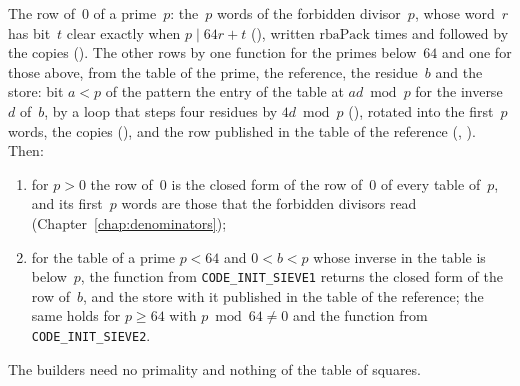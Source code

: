 \begin{lemma}\label{lem:primeRows}
  \leanok
  The row of~$0$ of a prime~$p$: the~$p$ words of the forbidden divisor~$p$, whose word~$r$ has
  bit~$t$ clear exactly when $p \mid 64 r + t$ (), written
  $\mathrm{rbaPack}$ times and followed by the copies ().
  The other rows by one function for the primes below~$64$ and one for those above, from the table
  of the prime, the reference, the residue~$b$ and the store: bit $a < p$ of the pattern the entry
  of the table at $a d \bmod p$ for the inverse~$d$ of~$b$, by a loop that steps four residues by
  $4 d \bmod p$ (), rotated into the first~$p$ words, the copies
  (), and the row published in the table of the reference
  (, ). Then:
  \begin{enumerate}
    \item for $p > 0$ the row of~$0$ is the closed form of the row of~$0$ of every table of~$p$,
      and its first~$p$ words are those that the forbidden divisors read
      (Chapter~\ref{chap:denominators});
    \item for the table of a prime $p < 64$ and $0 < b < p$ whose inverse in the table is
      below~$p$, the function from \verb|CODE_INIT_SIEVE1| returns the closed form of the row
      of~$b$, and the store with it published in the table of the reference; the same holds for
      $p \ge 64$ with $p \bmod 64 \ne 0$ and the function from \verb|CODE_INIT_SIEVE2|.
  \end{enumerate}
  The builders need no primality and nothing of the table of squares.
\end{lemma}

